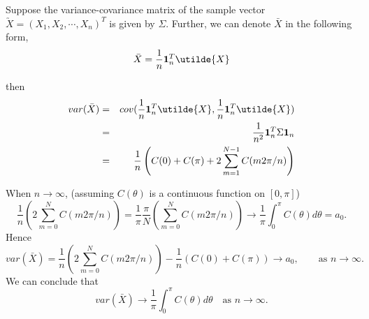 Suppose the variance-covariance matrix of the sample vector $\utilde{X} = (X_1, X_2, \cdots, X_n)^T$ is given by $\Sigma$. Further, we can denote $\bar{X}$ in the following form,
\[
	\bar{X} = \frac{1}{n}{\bf 1}_n^T \utilde{X}
\]
% 
% 
% 
% 
% 
% 
% 


then
\begin{eqnarray}
	var(\bar{X}) &=& cov(\frac{1}{n}{\bf 1}_n^T \utilde{X}, \frac{1}{n}{\bf 1}_n^T \utilde{X}) \nonumber \\
	&=& \frac{1}{n^2}{\bf 1}_n^T \Sigma {\bf 1}_n \nonumber \\
	&=& \frac{1}{n} \left(C(0)+C(\pi)+2 \sum_{m=1}^{N-1}C(m 2\pi/n)\right) \nonumber
\end{eqnarray}

When $n \to \infty$, (assuming $C(\theta)$ is a continuous function on $[0, \pi]$)
\[
	\frac{1}{n} \left(2 \sum_{m=0}^{N}C(m 2\pi/n)\right) = \frac{1}{\pi} \frac{\pi}{N} \left( \sum_{m=0}^{N}C(m 2\pi/n)\right) \to \frac{1}{\pi} \int_0^\pi C(\theta)d\theta = a_0.
\]
Hence
\[
	var(\bar{X}) = \frac{1}{n} \left(2 \sum_{m=0}^{N}C(m 2\pi/n)\right) - \frac{1}{n}(C(0) + C(\pi)) \to a_0, \quad \quad \mbox{as $n \to \infty$}.
\]
We can conclude that 
\[
	var(\bar{X}) \to \frac{1}{\pi} \int_0^\pi C(\theta)d\theta \quad \mbox{as $n \to \infty$}.  
\]

